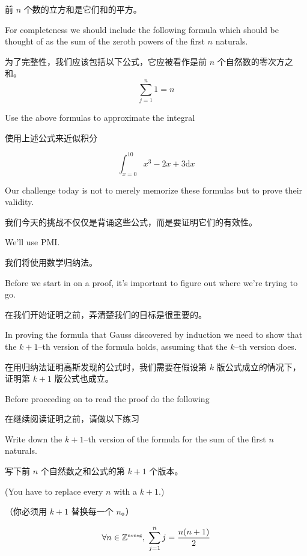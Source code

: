 \noindent 前 $n$ 个数的立方和是它们和的平方。

For completeness we should include the following formula which 
should be thought of as the sum of the zeroth powers of the first $n$
naturals.

为了完整性，我们应该包括以下公式，它应被看作是前 $n$ 个自然数的零次方之和。
\[ \sum_{j=1}^n 1 = n \]

\begin{exer}
Use the above formulas to approximate the integral

使用上述公式来近似积分

\[ \int_{x=0}^{10} x^3 - 2x +3 \mbox{d}x \]
\end{exer}
\bigskip

Our challenge today is not to merely memorize these formulas but
to prove their validity.

我们今天的挑战不仅仅是背诵这些公式，而是要证明它们的有效性。

We'll use PMI.

我们将使用数学归纳法。

Before we start in on a proof, it's important to figure out where 
we're trying to go.

在我们开始证明之前，弄清楚我们的目标是很重要的。

In proving the formula that Gauss discovered
by induction we need to show that the $k+1$--th version of the 
formula holds, assuming that the $k$--th version does.

在用归纳法证明高斯发现的公式时，我们需要在假设第 $k$ 版公式成立的情况下，证明第 $k+1$ 版公式也成立。

Before
proceeding on to read the proof do the following

在继续阅读证明之前，请做以下练习

\begin{exer}
Write down the $k+1$--th version of the formula for the sum of
the first $n$ naturals.

写下前 $n$ 个自然数之和公式的第 $k+1$ 个版本。

(You have to replace every $n$ with 
a $k+1$.)

（你必须用 $k+1$ 替换每一个 $n$。）
\end{exer}

\begin{thm}
\[ \forall n \in {\mathbb Z}^{\mbox{\tiny noneg}}, \; \sum_{j=1}^n j = \frac{n(n+1)}{2} \]
\end{thm}

